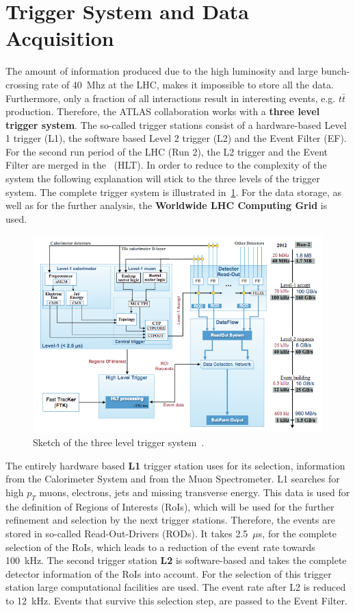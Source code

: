\section{Trigger System and Data Acquisition}


 The amount of information produced due to the  high luminosity and large bunch-crossing rate of 40~Mhz at the LHC, makes it impossible to store all the data. Furthermore, only a fraction of all interactions result in interesting events, e.g. $t\bar{t}$ production. Therefore, the ATLAS collaboration works with a \textbf{three level trigger system}. The so-called trigger stations consist of a hardware-based Level 1 trigger (L1), the software based Level 2 trigger (L2) and the Event Filter (EF). For the second run period of the LHC (Run 2), the L2 trigger and the Event Filter are merged in  the~ (HLT). In order to reduce to the complexity of the system the following explanation will stick to the three levels of the trigger system. The complete trigger system is illustrated in~\cref{fig:38}. For the data storage, as well as for the further analysis, the \textbf{Worldwide LHC Computing Grid} is used.

\begin{figure}[t]
	\centering
	\includegraphics[width=0.80\linewidth]{trigger}
	\caption{Sketch of the three level trigger system~\cite{Nakahama:2015211}.} 
	\label{fig:38}
\end{figure}


 The entirely hardware based \textbf{L1} trigger station uses for its selection, information from the Calorimeter System and from the Muon Spectrometer. L1 searches for high $p_T$ muons, electrons, jets and missing transverse energy. This data is used for the definition of Regions of Interests (RoIs), which will be used for the further refinement and selection by the next trigger stations. Therefore, the events are stored in so-called Read-Out-Drivers (RODs). It takes 2.5~$\mu$s, for the complete selection of the RoIs, which leads to a reduction of the event rate towards 100~kHz. The second trigger station \textbf{L2} is software-based and takes the complete detector information of the RoIs into account. For the selection of this trigger station large computational facilities are used. The event rate after L2 is reduced to 12~kHz. 
Events that survive this selection step, are passed to the Event Filter.

